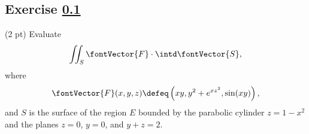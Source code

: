 \newpage



\subsection{Exercise \ref{sec: Vector Calculus Q4}}
\label{sec: Vector Calculus Q4}

(2 pt) Evaluate
\begin{align*}
\iint_{S} \fontVector{F} \cdot \intd \fontVector{S},
\end{align*}
where
\begin{align*}
\fontVector{F}(x,y,z)
\defeq
\left(x y,y^{2} + e^{x z^{2}},\sin(x y)\right),
\end{align*}
and $S$ is the surface of the region $E$ bounded by the parabolic cylinder $z = 1 - x^{2}$ and the planes $z = 0$, $y = 0$, and $y + z = 2$.